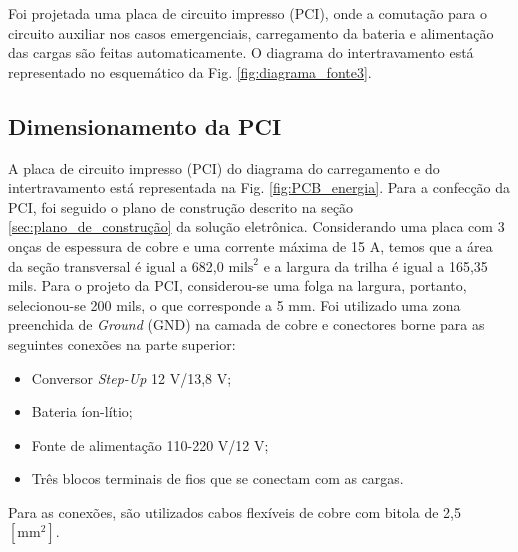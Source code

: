 Foi projetada uma placa de circuito impresso (PCI), onde a comutação para o circuito auxiliar nos casos emergenciais, carregamento da bateria e alimentação das cargas são feitas automaticamente. O diagrama do intertravamento está representado no esquemático da Fig. \ref{fig:diagrama_fonte3}.


\subsection{Dimensionamento da PCI}

A placa de circuito impresso (PCI) do diagrama do carregamento e do intertravamento está representada na Fig. \ref{fig:PCB_energia}. Para a confecção da PCI, foi seguido o plano de construção descrito na seção \ref{sec:plano_de_construção} da solução eletrônica. Considerando uma placa com 3 onças de espessura de cobre e uma corrente máxima de 15 A, temos que a área da seção transversal é igual a 682,0 $\text{mils}^2$ e a largura da trilha é igual a 165,35 mils. Para o projeto da PCI, considerou-se uma folga na largura, portanto, selecionou-se 200 mils, o que corresponde a 5 mm. Foi utilizado uma zona preenchida de \textit{Ground} (GND) na camada de cobre e conectores borne para as seguintes conexões na parte superior:

\begin{itemize}
    \item Conversor \textit{Step-Up} 12 V/13,8 V;
    
    \item Bateria íon-lítio;
    
    \item Fonte de alimentação 110-220 V/12 V;
    
    \item Três blocos terminais de fios que se conectam com as cargas. 
\end{itemize}

Para as conexões, são utilizados cabos flexíveis de cobre com bitola de 2,5 $[\text{mm}^2]$. 

